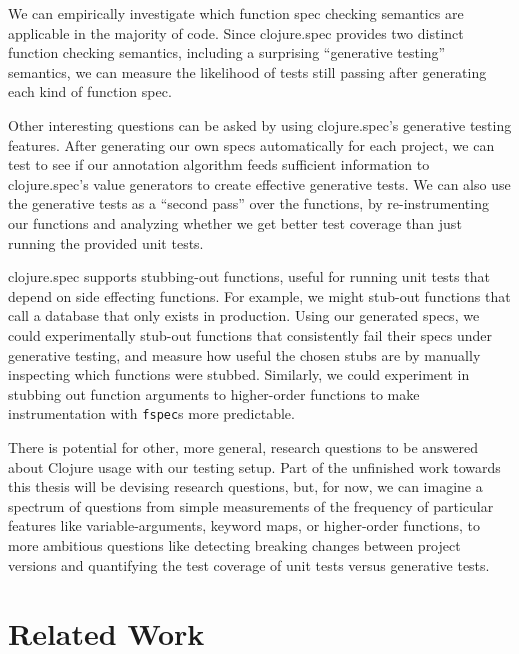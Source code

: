 \documentclass[9pt]{extarticle}
\begin{document}
We can empirically investigate which function spec checking semantics are 
applicable in the majority of code. Since clojure.spec provides
two distinct function checking semantics, including a surprising
``generative testing'' semantics, we can measure the likelihood
of tests still passing after generating each kind of function spec.

Other interesting questions can be asked by using clojure.spec's generative
testing features. After generating our own specs automatically for each project,
we can test to see if our annotation algorithm feeds sufficient information
to clojure.spec's value generators to create effective generative tests.
We can also use the generative tests as a ``second pass'' over the functions,
by re-instrumenting our functions and analyzing whether we get better
test coverage than just running the provided unit tests.

clojure.spec supports stubbing-out functions, useful for running unit
tests that depend on side effecting functions. For example, we might
stub-out functions that call a database that only exists in production.
Using our generated specs, we could experimentally stub-out functions
that consistently fail their specs under generative testing,
and measure how useful the chosen stubs are by manually inspecting
which functions were stubbed.
Similarly, we could experiment in stubbing out function arguments
to higher-order functions to make instrumentation with \texttt{fspec}s
more predictable.


There is potential for other, more general, research questions
to be answered about Clojure usage with our testing setup.
Part of the unfinished work towards this thesis will be devising research questions,
but, for now, we can imagine a spectrum of questions
from simple measurements of the frequency of particular features like variable-arguments,
keyword maps, or higher-order functions, to more ambitious questions
like detecting breaking changes between project versions
and quantifying the test coverage of unit tests versus generative tests.

\section{Related Work}
\end{document}
